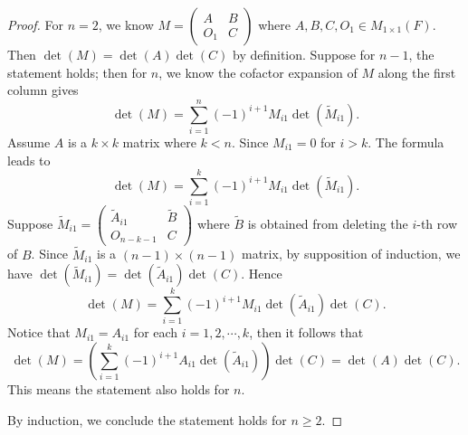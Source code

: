 \begin{Exercise}
\begin{proof}
For $n=2$, we know $M = \begin{pmatrix}
A & B \\
O_1 & C
\end{pmatrix}$ where $A,B,C,O_1\in M_{1\times 1}(F)$. Then $\det(M) = \det(A)\det(C)$ by definition. Suppose for $n-1$, the statement holds; then for $n$, we know the cofactor expansion of $M$ along the first column gives
$$
\det(M) = \sum_{i=1}^{n}(-1)^{i+1} M_{i 1} \det(\tilde{M}_{i 1}).
$$
Assume $A$ is a $k\times k$ matrix where $k<n$. Since $M_{i 1} = 0$ for $i>k$. The formula leads to
$$
\det(M) = \sum_{i=1}^{k}(-1)^{i+1} M_{i 1} \det(\tilde{M}_{i 1}).
$$
Suppose
$
\tilde{M}_{i 1} = \begin{pmatrix}
\tilde{A}_{i 1} & \tilde{B} \\
O_{n-k-1} & C
\end{pmatrix}
$
where $\tilde{B}$ is obtained from deleting the $i$-th row of $B$. Since $\tilde{M}_{i 1}$ is a $(n-1)\times(n-1)$ matrix, by supposition of induction, we have $\det(\tilde{M}_{i 1}) = \det(\tilde{A}_{i 1})\det(C)$. Hence
$$
\det(M) = \sum_{i=1}^{k}(-1)^{i+1} M_{i 1} \det(\tilde{A}_{i 1})\det(C).
$$
Notice that $M_{i 1} = A_{i 1}$ for each $i=1,2,\cdots,k$, then it follows that
$$
\det(M) = \left(\sum_{i=1}^{k}(-1)^{i+1} A_{i 1} \det(\tilde{A}_{i 1}) \right)\det(C)
= \det(A)\det(C).
$$
This means the statement also holds for $n$.

By induction, we conclude the statement holds for $n\geq 2$.
\end{proof}
\end{Exercise}